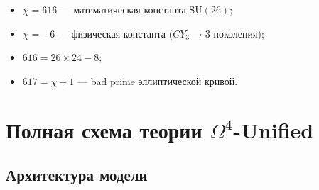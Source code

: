 \documentclass[12pt,a4paper,twoside]{article}
\newcommand{\SU}{\mathrm{SU}}
\theoremstyle{definition}
\begin{document}
\begin{itemize}
    \item $\chi = 616$ — математическая константа $\SU(26)$;
    \item $\chi = -6$ — физическая константа ($CY_3 \to 3$ поколения);
    \item $616 = 26 \times 24 - 8$;
    \item $617 = \chi + 1$ — bad prime эллиптической кривой.
\end{itemize}

\section{Полная схема теории $\Omega^4$-Unified}
\label{sec:full_scheme}

\subsection{Архитектура модели}
\end{document}
